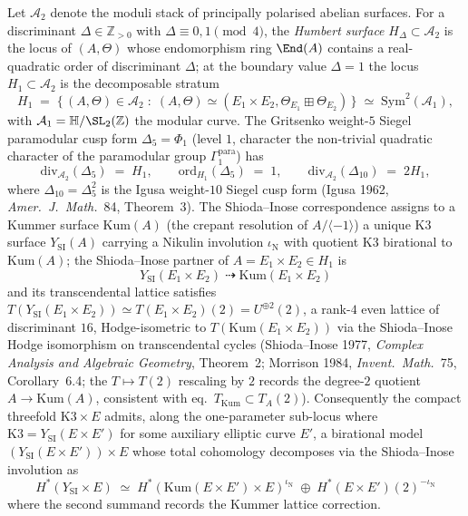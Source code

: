 \begin{proposition}
\label{prop:cy-c-humbert-shioda-inose-k3e}
Let $\mathcal{A}_2$ denote the moduli stack of principally polarised
abelian surfaces. For a discriminant $\Delta \in \mathbb Z_{>0}$ with
$\Delta \equiv 0, 1 \pmod 4$, the \emph{Humbert surface}
$H_\Delta \subset \mathcal{A}_2$ is the locus of $(A, \Theta)$ whose
endomorphism ring $\End(A)$ contains a real-quadratic order of
discriminant $\Delta$; at the boundary value $\Delta = 1$ the locus
$H_1 \subset \mathcal{A}_2$ is the decomposable stratum
\[
 H_1 \;=\; \bigl\{\, (A, \Theta) \in \mathcal{A}_2 \;:\;
 (A, \Theta) \simeq (E_1 \times E_2, \Theta_{E_1} \boxplus \Theta_{E_2})
 \,\bigr\} \;\simeq\; \mathrm{Sym}^2(\mathcal{A}_1),
\]
with $\mathcal{A}_1 = \mathbb H/\SL_2(\mathbb Z)$ the modular curve.
The Gritsenko weight-$5$ Siegel paramodular cusp form
$\Delta_5 = \Phi_1$ (level $1$, character the non-trivial quadratic
character of the paramodular group $\Gamma^{\mathrm{para}}_1$) has
\[
 \mathrm{div}_{\mathcal{A}_2}(\Delta_5) \;=\; H_1,
 \qquad
 \mathrm{ord}_{H_1}(\Delta_5) \;=\; 1,
 \qquad
 \mathrm{div}_{\mathcal{A}_2}(\Delta_{10}) \;=\; 2 H_1,
\]
where $\Delta_{10} = \Delta_5^2$ is the Igusa weight-$10$ Siegel cusp
form (Igusa 1962, \emph{Amer.\ J.\ Math.}~84, Theorem~3). The
Shioda--Inose correspondence assigns to a Kummer surface
$\mathrm{Kum}(A)$ (the crepant resolution of $A/\langle -1 \rangle$)
a unique K3 surface $Y_{\mathrm{SI}}(A)$ carrying a Nikulin involution
$\iota_{\mathrm{N}}$ with quotient K3 birational to $\mathrm{Kum}(A)$;
the Shioda--Inose partner of $A = E_1 \times E_2 \in H_1$ is
\[
 Y_{\mathrm{SI}}(E_1 \times E_2)
 \;\dashrightarrow\; \mathrm{Kum}(E_1 \times E_2)
\]
and its transcendental lattice satisfies
$T(Y_{\mathrm{SI}}(E_1 \times E_2)) \simeq T(E_1 \times E_2)(2) = U^{\oplus 2}(2)$,
a rank-$4$ even lattice of discriminant $16$, Hodge-isometric to
$T(\mathrm{Kum}(E_1 \times E_2))$ via the Shioda--Inose Hodge
isomorphism on transcendental cycles (Shioda--Inose 1977, \emph{Complex
Analysis and Algebraic Geometry}, Theorem~2; Morrison 1984,
\emph{Invent.\ Math.}~75, Corollary~6.4; the $T \mapsto T(2)$
rescaling by $2$ records the degree-$2$ quotient
$A \to \mathrm{Kum}(A)$, consistent with
\cite{VolI} eq.~$T_{\mathrm{Kum}} \subset T_A(2)$). Consequently the compact
threefold $\mathrm{K3} \times E$ admits, along the one-parameter
sub-locus where $\mathrm{K3} = Y_{\mathrm{SI}}(E \times E')$ for some
auxiliary elliptic curve $E'$, a birational model
$(Y_{\mathrm{SI}}(E \times E')) \times E$ whose total cohomology
decomposes via the Shioda--Inose involution as
\[
 H^*(Y_{\mathrm{SI}} \times E) \;\simeq\;
 H^*(\mathrm{Kum}(E \times E') \times E)^{\iota_{\mathrm{N}}}
 \;\oplus\;
 H^*(E \times E')(2)^{-\iota_{\mathrm{N}}}
\]
where the second summand records the Kummer lattice correction.
\end{proposition}

